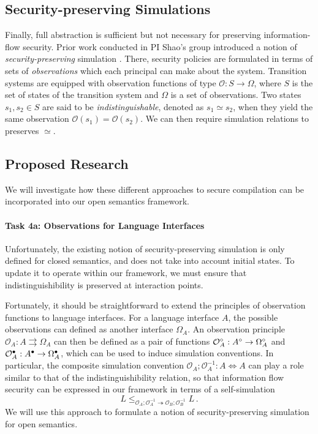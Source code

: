 \subsection{Security-preserving Simulations}

Finally,
full abstraction is sufficient but not necessary
for preserving information-flow security.
Prior work conducted in PI Shao's group
introduced a notion of \emph{security-preserving} simulation
\cite{costanzo16}.
There,
security policies are formulated in terms
of sets of \emph{observations} 
which each principal can make about the system.
Transition systems are equipped with observation functions of type
$\mathcal{O} : S \rightarrow \Omega$,
where $S$ is the set of states of the transition system and
$\Omega$ is a set of observations.
Two states $s_1, s_2 \in S$
are said to be \emph{indistinguishable},
denoted as $s_1 \simeq s_2$,
when they yield the same observation
$\mathcal{O}(s_1) = \mathcal{O}(s_2)$.
We can then require
simulation relations to preserves $\simeq$.

\subsection{Proposed Research}

We will investigate how these different approaches to secure compilation
can be incorporated into our open semantics framework.

\vspace*{-2ex}
\paragraph*{Task 4a: Observations for Language Interfaces}

Unfortunately,
the existing notion of security-preserving simulation
is only defined for closed semantics,
and does not take into account initial states.
To update it to operate within our framework,
we must ensure that indistinguishibility is preserved
at interaction points.

Fortunately,
it should be straightforward to extend
the principles of observation functions to language interfaces.
For a language interface $A$,
the possible observations can defined as another interface $\Omega_A$.
An observation principle
$\mathcal{O}_A : A \rightrightarrows \Omega_A$
can then be defined as a pair of functions
$
  \mathcal{O}_A^\circ : A^\circ \rightarrow \Omega_A^\circ
$
and
$
  \mathcal{O}_A^\bullet : A^\bullet \rightarrow \Omega_A^\bullet
$,
which can be used to induce simulation conventions.
In particular,
the composite simulation convention
$
  \mathcal{O}_A \mathbin; \mathcal{O}_A^{-1} :
  A \Leftrightarrow A
$
can play a role similar to that of the indistinguishibility relation,
so that information flow security can be expressed
in our framework
in terms of a self-simulation
\[
  L \le_{\mathcal{O}_A \mathbin; \mathcal{O}_A^{-1} \twoheadrightarrow
         \mathcal{O}_B \mathbin; \mathcal{O}_B^{-1}} L
  \,.
\]
We will use this approach
to formulate a notion of security-preserving simulation
for open semantics.

